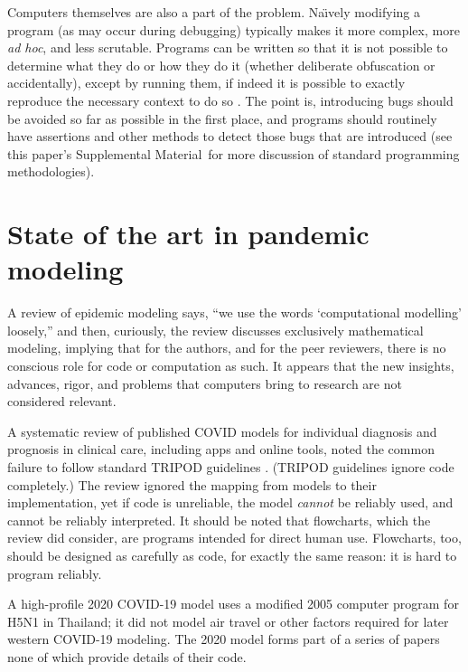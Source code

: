 \documentclass[10pt,letterpaper]{article}
\def\supplement{Supplemental Material}
\begin{document}
Computers themselves are also a part of the problem. Na\"\i vely modifying a program (as may occur during debugging) typically makes it more complex, more \emph{ad hoc}, and less scrutable. Programs can be written so that it is not possible to determine what they do or how they do it (whether deliberate obfuscation or accidentally), except by running them, if indeed it is possible to exactly reproduce the necessary context to do so \cite{framework}. The point is, introducing bugs should be avoided so far as possible in the first place, and programs should routinely have assertions and other methods to detect those bugs that are introduced (see this paper's \supplement\ for more discussion of standard programming methodologies).
\fi

\section{State of the art in pandemic modeling}
A review of epidemic modeling \cite{science-review} says, ``we use the words `computational modelling' loosely,'' and then, curiously, the review discusses exclusively mathematical modeling, implying that for the authors, and for the peer reviewers, there is no conscious role for code or computation as such. It appears that the new insights, advances, rigor, and problems that computers bring to research are not considered relevant. 

A systematic review \cite{diagnosis-reviews} of published COVID models for individual diagnosis and prognosis in clinical care, including apps and online tools, noted the common failure to follow standard TRIPOD guidelines \cite{tripod}. (TRIPOD guidelines ignore code completely.) The review \cite{diagnosis-reviews} ignored the mapping from models to their implementation, yet if code is unreliable, the model \emph{cannot\/} be reliably used, and cannot be reliably interpreted. It should be noted that flowcharts, which the review did consider, are programs intended for direct human use. Flowcharts, too, should be designed as carefully as code, for exactly the same reason: it is hard to program reliably. 

A high-profile 2020 COVID-19 model \cite{nature-summary,ICmodel} uses a modified 2005 computer program \cite{avianFluModel,originalICmodel} for H5N1 in Thailand; it did not model air travel or other factors required for later western COVID-19 modeling. The 2020 model forms part of a series of papers \cite{ICmodel,avianFluModel,originalICmodel} none of which provide details of their code. 
\end{document}
